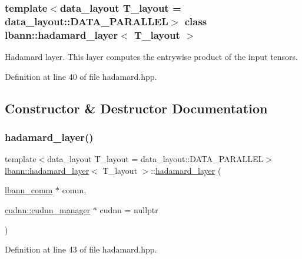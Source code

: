 \subsubsection*{template$<$data\+\_\+layout T\+\_\+layout = data\+\_\+layout\+::\+D\+A\+T\+A\+\_\+\+P\+A\+R\+A\+L\+L\+EL$>$\newline
class lbann\+::hadamard\+\_\+layer$<$ T\+\_\+layout $>$}

Hadamard layer. This layer computes the entrywise product of the input tensors. 

Definition at line 40 of file hadamard.\+hpp.



\subsection{Constructor \& Destructor Documentation}
\mbox{\label{classlbann_1_1hadamard__layer_af79b4f3d1e2709092b36fb0f38d30430}} 
\subsubsection{\texorpdfstring{hadamard\+\_\+layer()}{hadamard\_layer()}}
{\footnotesize\ttfamily template$<$data\+\_\+layout T\+\_\+layout = data\+\_\+layout\+::\+D\+A\+T\+A\+\_\+\+P\+A\+R\+A\+L\+L\+EL$>$ \\
\hyperlink{classlbann_1_1hadamard__layer}{lbann\+::hadamard\+\_\+layer}$<$ T\+\_\+layout $>$\+::\hyperlink{classlbann_1_1hadamard__layer}{hadamard\+\_\+layer} (\begin{DoxyParamCaption}\item[{\hyperlink{classlbann_1_1lbann__comm}{lbann\+\_\+comm} $\ast$}]{comm,  }\item[{\hyperlink{classlbann_1_1cudnn_1_1cudnn__manager}{cudnn\+::cudnn\+\_\+manager} $\ast$}]{cudnn = {\ttfamily nullptr} }\end{DoxyParamCaption})\hspace{0.3cm}{\ttfamily [inline]}}



Definition at line 43 of file hadamard.\+hpp.


